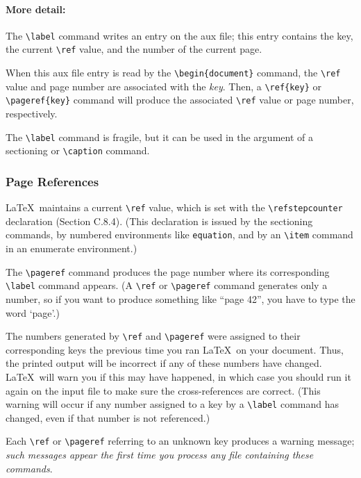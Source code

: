 \documentclass{article}
\newcommand{\justtext}[1]{\texttt{\textbackslash #1}}
\begin{document}
\paragraph{More detail:} The \justtext{label} command writes an entry on the aux file; this entry
contains the key, the current \justtext{ref} value, and the number of the current page. 
 
When this aux file entry is read by the \justtext{begin\{document\}} command, 
the \justtext{ref} value and page number are associated with the \emph{key}. 
Then, a \justtext{ref\{key\}} or \justtext{pageref\{key\}} command will produce the associated 
\justtext{ref} value or page number, respectively.
 
The \justtext{label} command is fragile, but it can be used in the argument of
a sectioning or \justtext{caption} command.

\subsubsection{Page References}

\LaTeX\ maintains a current \justtext{ref} value, which is set with the \justtext{refstepcounter} 
declaration (Section C.8.4). (This declaration is issued by the sectioning commands, by numbered
environments like {\tt equation}, and by an \justtext{item} command in an enumerate environment.)

The \justtext{pageref} command produces the page number where its corresponding \justtext{label} 
command appears. (A \justtext{ref} or \justtext{pageref} command generates only a number, so if you 
want to produce something like ``page 42'', you have to type the word `page'.)

The numbers generated by \justtext{ref} and \justtext{pageref} were assigned to their corresponding
keys the previous time you ran \LaTeX\ on your document. Thus, the printed output will be incorrect
if any of these numbers have changed. \LaTeX\ will warn you if this may have happened, in which
case you should run it again on the input file to make sure the cross-references are correct.
(This warning will occur if any number assigned to a key by a \justtext{label} command has changed,
even if that number is not referenced.) 

Each \justtext{ref} or \justtext{pageref} referring to an unknown key produces a warning
message; \emph{such messages appear the first time you process any file containing these commands}.
\end{document}
